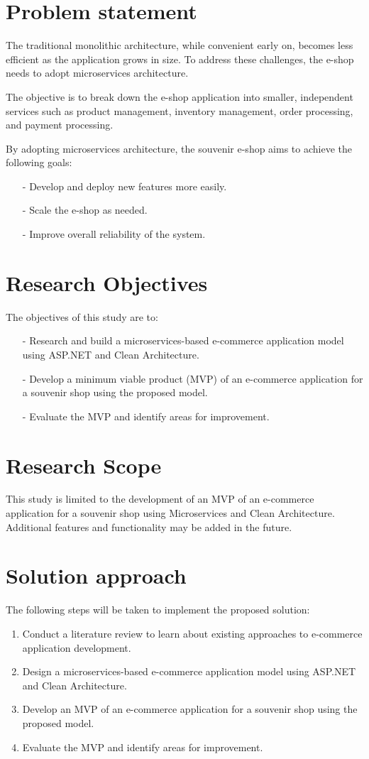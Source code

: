 \section{Problem statement}
The traditional monolithic architecture, while convenient early on, becomes less efficient as the application grows in size. To address these challenges, the e-shop needs to adopt microservices architecture.

The objective is to break down the e-shop application into smaller, independent services such as product management, inventory management, order processing, and payment processing.

By adopting microservices architecture, the souvenir e-shop aims to achieve the following goals:
\begin{itemize}
    \item[-] Develop and deploy new features more easily.
    \item[-] Scale the e-shop as needed.
    \item[-] Improve overall reliability of the system.
\end{itemize}

\section{Research Objectives}
The objectives of this study are to:
\begin{itemize}
    \item[-] Research and build a microservices-based e-commerce application model using ASP.NET and Clean Architecture.
    \item[-] Develop a minimum viable product (MVP) of an e-commerce application for a souvenir shop using the proposed model.
    \item[-] Evaluate the MVP and identify areas for improvement.
\end{itemize}
\section{Research Scope}
This study is limited to the development of an MVP of an e-commerce application for a souvenir shop using Microservices and Clean Architecture. Additional features and functionality may be added in the future.
\section{Solution approach}
The following steps will be taken to implement the proposed solution:
\begin{enumerate}
    \item Conduct a literature review to learn about existing approaches to e-commerce application development.
    \item Design a microservices-based e-commerce application model using ASP.NET and Clean Architecture.
    \item Develop an MVP of an e-commerce application for a souvenir shop using the proposed model.
    \item Evaluate the MVP and identify areas for improvement.
\end{enumerate}

